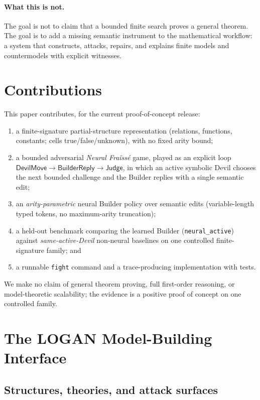 \documentclass[11pt]{article}
\begin{document}
\paragraph{What this is not.}
The goal is not to claim that a bounded finite search proves a general theorem.  The goal is to add a missing semantic instrument to the mathematical workflow: a system that constructs, attacks, repairs, and explains finite models and countermodels with explicit witnesses.

\section{Contributions}

This paper contributes, for the current proof-of-concept release:
\begin{enumerate}[leftmargin=2em]
  \item a finite-signature partial-structure representation (relations, functions, constants; cells true/false/unknown), with no fixed arity bound;
  \item a bounded adversarial \emph{Neural Fra\"iss\'e} game, played as an explicit loop \(\textsf{DevilMove}\to\textsf{BuilderReply}\to\textsf{Judge}\), in which an active symbolic Devil chooses the next bounded challenge and the Builder replies with a single semantic edit;
  \item an \emph{arity-parametric} neural Builder policy over semantic edits (variable-length typed tokens, no maximum-arity truncation);
  \item a held-out benchmark comparing the learned Builder (\texttt{neural\_active}) against \emph{same-active-Devil} non-neural baselines on one controlled finite-signature family; and
  \item a runnable \texttt{fight} command and a trace-producing implementation with tests.
\end{enumerate}
We make no claim of general theorem proving, full first-order reasoning, or model-theoretic scalability; the evidence is a positive proof of concept on one controlled family.

\section{The LOGAN Model-Building Interface}

\subsection{Structures, theories, and attack surfaces}
\end{document}
